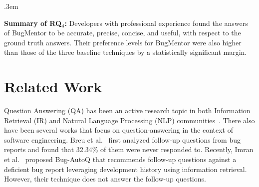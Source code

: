 \FrameSep.3em
\begin{frshaded}
	\noindent
	\textbf{Summary of RQ$\mathbf{_4}$:} Developers with professional experience found the answers of BugMentor to be accurate, precise, concise, and useful, with respect to the ground truth answers. Their preference levels for BugMentor were also higher than those of the three baseline techniques by a statistically significant margin.  
\end{frshaded}


\section{Related Work} \label{Chap1:RelatedWork}

Question Answering (QA) has been an active research topic in both Information Retrieval (IR) and Natural Language Processing (NLP) communities~\cite{ravichandran2002learning, brill2002analysis,waltz1978english, iyyer2014neural,asaduzzaman2013answering, tian2017apibot, lu2021beat, bansal2021neural, xu2017answerbot, abdellatif2020msrbot}. There also have been several works that focus on question-answering in the context of software engineering. Breu et al.~\cite{breu2010information} first analyzed follow-up questions from bug reports and found that 32.34\% of them were never responded to. Recently, Imran et al.~\cite{imran2021automatically} proposed Bug-AutoQ that recommends follow-up questions against a deficient bug report leveraging development history using information retrieval. However, their technique does not answer the follow-up questions.\par



